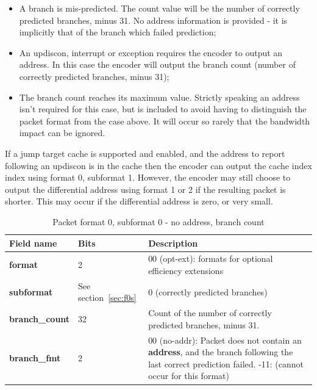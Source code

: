 \begin{itemize}
  \item A branch is mis-predicted.  The count value will be the number of correctly predicted branches, 
    minus 31.  No address information is provided - it is implicitly that of the branch which failed
    prediction;
  \item An updiscon, interrupt or exception requires the encoder to output an address.  In this case 
    the encoder will output the branch count (number of correctly predicted branches, minus 31);
  \item The branch count reaches its maximum value.  Strictly speaking an address isn't required for this case, 
    but is included to avoid having to distinguish the packet format from the case above.  It will occur so rarely 
    that the bandwidth impact can be ignored.
\end{itemize}

If a jump target cache is supported and enabled, and the address to report following an updiscon is
in the cache then the encoder can output the cache index index using format 0, subformat 1.  
However, the encoder may still choose to output the differential address using format 1 or 2 if the 
resulting packet is shorter.  This may occur if the differential address is zero, or very small.

\begin{table}[htp]
  \centering
  \caption{Packet format 0, subformat 0 - no address, branch count}
  \label{tab:te_inst0-0-noaddr-count}
  \begin{tabulary}{\textwidth}{|l|p{35mm}|p{90mm}|}
    \hline
    {\bf Field name} & {\bf Bits} & {\bf Description} \\
    \hline
    \textbf{format}	& 2	& 00 (opt-ext): formats for optional efficiency extensions\\
    \hline
    \textbf{subformat}  & See section~\ref{sec:f0s} & 0 (correctly predicted branches)\\
    \hline
    \textbf{branch\_count} & 32 & Count of the number of correctly predicted branches, minus 31. \\
    \hline
    \textbf{branch\_fmt} & 2 & 00 (no-addr): Packet does not contain an \textbf{address}, and the branch following the 
    last correct prediction failed. -11: (cannot occur for this format) \\
    \hline
  \end{tabulary}
\end{table}

